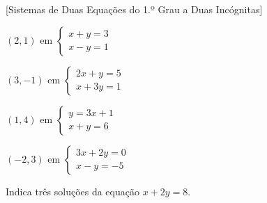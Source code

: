 \documentclass[12pt]{article}
\begin{document}
[Sistemas de Duas Equações do 1.º Grau a Duas Incógnitas]


\begin{exercicios}
  \item $(2, 1)$ \; em \; $\begin{cases} x + y = 3 \\ x - y = 1 \end{cases}$
  \item $(3, -1)$ \; em \; $\begin{cases} 2x + y = 5 \\ x + 3y = 1 \end{cases}$
  \item $(1, 4)$ \; em \; $\begin{cases} y = 3x + 1 \\ x + y = 6 \end{cases}$
  \item $(-2, 3)$ \; em \; $\begin{cases} 3x + 2y = 0 \\ x - y = -5 \end{cases}$
  \item Indica três soluções da equação $x + 2y = 8$.
\end{exercicios}
\end{document}
